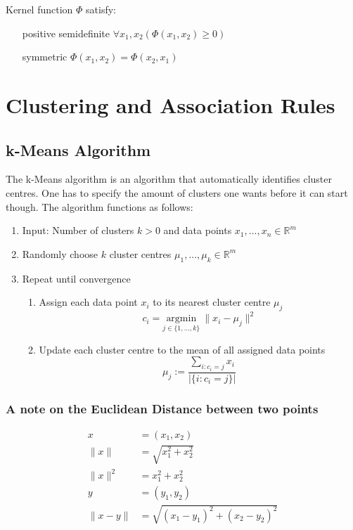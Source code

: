 \documentclass[11pt]{article}
\begin{document}
Kernel function $\Phi$ satisfy:
\begin{enumerate}[leftmargin=*, labelindent=5cm, labelsep=0.5cm]
    \item[positive semidefinite]$\forall x_1,x_2(\Phi(x_1,x_2)\geq 0)$
    \item[symmetric] $\Phi(x_1,x_2) = \Phi(x_2,x_1)$
\end{enumerate}

\section{Clustering and Association Rules}

\subsection{k-Means Algorithm}

The k-Means algorithm is an algorithm that automatically identifies cluster centres. One has to specify the amount of clusters one wants before it can start though. The algorithm functions as follows:

\begin{enumerate}
    \item Input: Number of clusters $k>0$ and data points $x_1,...,x_n \in \mathbb{R}^m$
    \item Randomly choose $k$ cluster centres $\mu_1,...,\mu_k \in \mathbb{R}^m$
    \item Repeat until convergence
          \begin{enumerate}
              \item Assign each data point $x_i$ to its nearest cluster centre $\mu_j$
                    \begin{equation*}
                        c_i = \underset{j\in\{1,...,k\}}{\text{argmin}}\ \| x_i - \mu_j \|^2
                    \end{equation*}
              \item  Update each cluster centre to the mean of all assigned data points
                    \begin{equation*}
                        \mu_j := \frac{\sum_{i:c_i=j} x_i}{|\{i:c_i = j\}|}
                    \end{equation*}
          \end{enumerate}
\end{enumerate}

\subsubsection{A note on the Euclidean Distance between two points}
\begin{align*}
    x           & = (x_1,x_2)                            \\
    \| x \|     & = \sqrt{x_1^2 + x_2^2}                 \\
    \| x \|^2   & = x_1^2 + x_2^2                        \\
    y           & = (y_1, y_2)                           \\
    \| x - y \| & = \sqrt{(x_1 - y_1)^2 + (x_2 - y_2)^2}
\end{align*}
\end{document}
